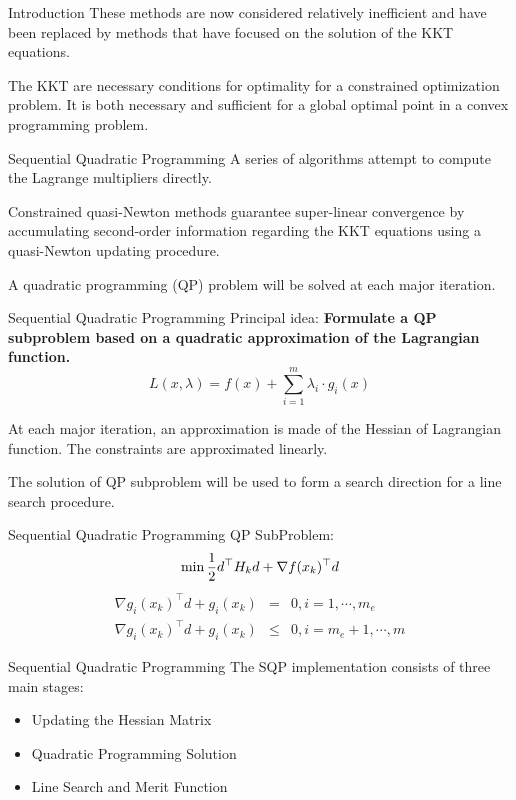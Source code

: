 \documentclass[10pt, compress]{beamer}
\begin{document}
\begin{frame}[fragile]{Introduction}
These methods are now considered relatively inefficient and have been replaced by methods that have focused on the solution of the KKT equations.

The KKT are necessary conditions for optimality for a constrained optimization problem. It is both necessary and sufficient for a global optimal point in a convex programming problem. 
\end{frame}

\begin{frame}[fragile]{Sequential Quadratic Programming}
A series of algorithms attempt to compute the Lagrange multipliers directly.

Constrained quasi-Newton methods guarantee super-linear convergence by accumulating second-order information regarding the KKT equations using a quasi-Newton updating procedure.

A quadratic programming (QP) problem will be solved at each major iteration.
\end{frame}

\begin{frame}[fragile]{Sequential Quadratic Programming}
Principal idea: \textbf{Formulate a QP subproblem based on a quadratic approximation of the Lagrangian function.}
$$L(x, \lambda) = f(x) + \sum_{i=1}^m \lambda_i \cdot g_i(x)$$

At each major iteration, an approximation is made of the Hessian of Lagrangian function. The constraints are approximated linearly. 

The solution of QP subproblem will be used to form a search direction for a line search procedure.
\end{frame}

\begin{frame}[fragile]{Sequential Quadratic Programming}
QP SubProblem:
$$ \min {1 \over 2} d^\top H_k d + \nabla f(x_k)^\top d$$
\begin{eqnarray*}
	\nabla g_i(x_k)^\top d + g_i(x_k) & = & 0, i = 1,\cdots, m_e \\
	\nabla g_i(x_k)^\top d + g_i(x_k) & \leq & 0, i = m_e+1,\cdots, m
\end{eqnarray*}
\end{frame}

\begin{frame}[fragile]{Sequential Quadratic Programming}
The SQP implementation consists of three main stages:
\begin{itemize}
  \item Updating the Hessian Matrix
  \item Quadratic Programming Solution
  \item Line Search and Merit Function
\end{itemize}
\end{frame}
\end{document}

